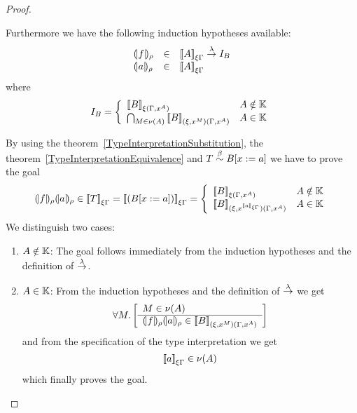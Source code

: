 \begin{theorem}
\begin{proof}
\begin{enumerate}
            Furthermore we have the following induction hypotheses available:
            $$
            \begin{array}{lll}
                \terminter{f}{\rho}
                &\in& \typeinter{A}{\xi\Gamma} \tolambda I_B
                \\
                \terminter{a}{\rho} &\in& \typeinter{A}{\xi\Gamma}
            \end{array}
            $$
            where
            $$
            I_B =
            \left\{
            \begin{array}{ll}
                {{[\![}B{]\!]}}_{\xi(\Gamma,x^A)}
                & A \notin \mathbb{K}
                \\
                \bigcap_{M \in \nu(A)}
                {{[\![} B{]\!]}}_{(\xi,x^M)(\Gamma,x^A)}
                & A \in \mathbb{K}
            \end{array}
            \right.
            $$

            By using the theorem~\ref{TypeInterpretationSubstitution}, the
            theorem~\ref{TypeInterpretationEquivalence} and $T
            \stackrel{\beta}{\sim} B[x:=a]$ we have to prove the goal
            $$
            \terminter{f}{\rho}
            \terminter{a}{\rho}
            \in
            \typeinter{T}{\xi\Gamma}
            =
            \typeinter{(B[x:=a])}{\xi\Gamma}
            =
            \left\{
                \begin{array}{ll}
                    \typeinter{B}{\xi(\Gamma,x^A)}
                    &
                    A \notin \Kinds
                    \\
                    \typeinter
                    {B}
                    {(\xi,x^{\typeinter{a}{\xi\Gamma}})(\Gamma,x^A)}
                    &
                    A \in \Kinds
                \end{array}
            \right.
            $$
            We distinguish two cases:
            \begin{enumerate}
            \item $A \notin \mathbb{K}$: The goal follows immediately from the
                induction hypotheses and the definition of $\stackrel{\lambda}{\to}$.

            \item $A \in \mathbb{K}$: From the induction hypotheses and the
                definition of $\stackrel{\lambda}{\to}$ we get
                $$
                    \forall M. \left[ \begin{array}{l} M \in \nu(A) \\ \hline 
                        {(\!|f|\!)_{\rho}}
                        {(\!|a|\!)_{\rho}}
                        \in
                        {{[\![}B{]\!]}}_{(\xi,x^M)(\Gamma,x^A)}
                    \end{array} \right]
                $$
                and from the specification of the type interpretation we get
                $$
                    {{[\![} a{]\!]}}_{\xi\Gamma} \in \nu(A)
                $$
                which finally proves the goal.
            \end{enumerate}
        \end{enumerate}
    \end{proof}
\end{theorem}





